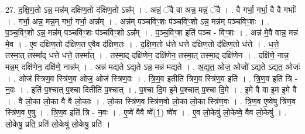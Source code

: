 \documentclass[17pt]{extarticle}
\begin{document}
27. द॒क्षि॒ण॒तो ऽन्न॒ मन्न॑म् दक्षिण॒तो द॑क्षिण॒तो ऽन्न᳚म् । . अन्नं॒ ॅवै वा अन्न॒ मन्नं॒ ॅवै । . वै गर्भा॒ गर्भा॒ वै वै गर्भाः᳚ । . गर्भा॒ अन्न॒ मन्न॒म् गर्भा॒ गर्भा॒ अन्न᳚म् । . अन्न॑म् पञ्चविꣳ॒॒शः प॑ञ्चविꣳ॒॒शो ऽन्न॒ मन्न॑म् पञ्चविꣳ॒॒शः । . प॒ञ्च॒विꣳ॒॒शो ऽन्न॒ मन्न॑म् पञ्चविꣳ॒॒शः प॑ञ्चविꣳ॒॒शो ऽन्न᳚म् । . प॒ञ्च॒विꣳ॒॒श इति॑ पञ्च - विꣳ॒॒शः । . अन्न॑ मे॒वै वान्न॒ मन्न॑ मे॒व । . ए॒व द॑क्षिण॒तो द॑क्षिण॒त ए॒वैव द॑क्षिण॒तः । . द॒क्षि॒ण॒तो ध॑त्ते धत्ते दक्षिण॒तो द॑क्षिण॒तो ध॑त्ते । . ध॒त्ते॒ तस्मा॒त् तस्मा᳚द् धत्ते धत्ते॒ तस्मा᳚त् । . तस्मा॒द् दक्षि॑णेन॒ दक्षि॑णेन॒ तस्मा॒त् तस्मा॒द् दक्षि॑णेन । . दक्षि॑णे॒ नान्न॒ मन्न॒म् दक्षि॑णेन॒ दक्षि॑णे॒ नान्न᳚म् । . अन्न॑ मद्यते ऽद्य॒ते ऽन्न॒ मन्न॑ मद्यते । . अ॒द्य॒त॒ ओज॒ ओजो᳚ ऽद्यते ऽद्यत॒ ओजः॑ । . ओज॑ स्त्रिण॒व स्त्रि॑ण॒व ओज॒ ओज॑ स्त्रिण॒वः । . त्रि॒ण॒व इतीति॑ त्रिण॒व स्त्रि॑ण॒व इति॑ । . त्रि॒ण॒व इति॑ त्रि - न॒वः । . इति॑ प॒श्चात् प॒श्चा दितीति॑ प॒श्चात् । . प॒श्चा दि॒म इ॒मे प॒श्चात् प॒श्चा दि॒मे । . इ॒मे वै वा इ॒म इ॒मे वै । . वै लो॒का लो॒का वै वै लो॒काः । . लो॒का स्त्रि॑ण॒व स्त्रि॑ण॒वो लो॒का लो॒का स्त्रि॑ण॒वः । . त्रि॒ण॒व ए॒ष्वे॑षु त्रि॑ण॒व स्त्रि॑ण॒व ए॒षु । . त्रि॒ण॒व इति॑ त्रि - न॒वः । . ए॒ष्वे॑ वैवै ष्वे᳚(1॒) ष्वे॑व । . ए॒व लो॒केषु॑ लो॒केष्वे॒ वैव लो॒केषु॑ । . लो॒केषु॒ प्रति॒ प्रति॑ लो॒केषु॑ लो॒केषु॒ प्रति॑ । \newline
\end{document}
